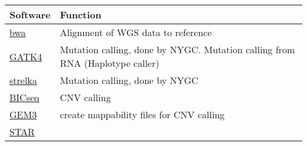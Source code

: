 \documentclass[
]{book}
\begin{document}
\begin{longtable}[]{@{}ll@{}}
\toprule
\begin{minipage}[b]{0.10\columnwidth}\raggedright
Software\strut
\end{minipage} & \begin{minipage}[b]{0.85\columnwidth}\raggedright
Function\strut
\end{minipage}\tabularnewline
\midrule
\endhead
\begin{minipage}[t]{0.10\columnwidth}\raggedright
\href{http://bio-bwa.sourceforge.net/}{bwa}\strut
\end{minipage} & \begin{minipage}[t]{0.85\columnwidth}\raggedright
Alignment of WGS data to reference\strut
\end{minipage}\tabularnewline
\begin{minipage}[t]{0.10\columnwidth}\raggedright
\href{https://software.broadinstitute.org/gatk/}{GATK4}\strut
\end{minipage} & \begin{minipage}[t]{0.85\columnwidth}\raggedright
Mutation calling, done by NYGC. Mutation calling from RNA (Haplotype caller)\strut
\end{minipage}\tabularnewline
\begin{minipage}[t]{0.10\columnwidth}\raggedright
\href{https://github.com/Illumina/strelka}{strelka}\strut
\end{minipage} & \begin{minipage}[t]{0.85\columnwidth}\raggedright
Mutation calling, done by NYGC\strut
\end{minipage}\tabularnewline
\begin{minipage}[t]{0.10\columnwidth}\raggedright
\href{http://compbio.med.harvard.edu/BIC-seq/}{BICseq}\strut
\end{minipage} & \begin{minipage}[t]{0.85\columnwidth}\raggedright
CNV calling\strut
\end{minipage}\tabularnewline
\begin{minipage}[t]{0.10\columnwidth}\raggedright
\href{https://sourceforge.net/projects/gemlibrary/files/gem-library/}{GEM3}\strut
\end{minipage} & \begin{minipage}[t]{0.85\columnwidth}\raggedright
create mappability files for CNV calling\strut
\end{minipage}\tabularnewline
\begin{minipage}[t]{0.10\columnwidth}\raggedright
\href{https://github.com/alexdobin/STAR}{STAR}\strut

\end{minipage}
\end{longtable}
\end{document}
